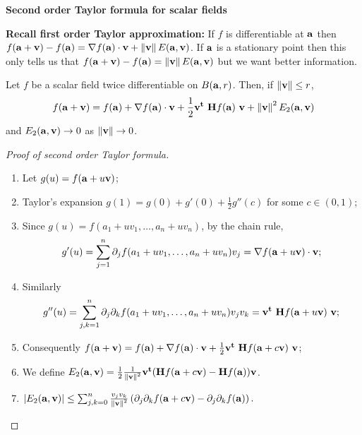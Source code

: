 \textbf{Second order Taylor formula for scalar fields}

\textbf{Recall first order Taylor approximation:}
If \(f\) is differentiable at \(\aa\)
then
\(  f(\aa+  \vv) - f(\aa)  = \nabla f(\aa) \cdot \vv + \norm{\vv}E(\aa,\vv)\).
If \(\aa\) is a stationary point then this only tells us that \(  f(\aa+  \vv) - f(\aa)  =  \norm{\vv}E(\aa,\vv)\) but we want better information.

\begin{theorem}
    Let \(f\) be a scalar field twice differentiable on \(B(\aa,r)\).
    Then, if \(\norm{\vv}\leq r\),
    \[
        f(\aa+\vv) = f(\aa) + \nabla f(\aa) \cdot \vv + \frac{1}{2} \vv^{\mathbf{t}} \ \mathbf{H} f (\aa) \ \vv + \norm{\vv}^2 E_2(\aa,\vv)
    \]
    and \(E_2(\aa,\vv) \to 0\) as \(\norm{\vv}\to 0\).
\end{theorem}





\textbf{}

\begin{proof}[Proof of second order Taylor formula]

    \begin{enumerate}
        \item Let \(g(u) = f(\aa + u \vv)\);
        \item Taylor's expansion \(g(1) = g(0) + g'(0) + \frac{1}{2} g''(c)\) for some \(c\in (0,1)\);
        \item Since \(g(u) = f(a_1 + uv_1, \ldots, a_n + u v_n)\), by the chain rule,
              \[
                  g'(u) = \sum_{j=1}^{n} \partial_j f( a_1 + uv_1, \ldots, a_n + u v_n ) v_j
                  =\nabla f( \aa + u \vv) \cdot \vv;
              \]
              \vspace{-2em}
        \item Similarly
              \vspace{-1em}
              \[
                  g''(u) = \sum_{j,k=1}^{n} \partial_j\partial_k f( a_1 + uv_1, \ldots, a_n + u v_n ) v_j v_k
                  =  \vv^{\mathbf{t}} \ \mathbf{H} f (\aa + u \vv) \ \vv;
              \]
              \vspace{-1em}
        \item Consequently
              \(
              f(\aa+\vv) = f(\aa) + \nabla f(\aa) \cdot \vv + \frac{1}{2} \vv^{\mathbf{t}} \ \mathbf{H} f (\aa + c\vv) \ \vv
              \);
        \item We define \(E_2(\aa,\vv) = \frac{1}{2} \frac{1}{\norm{\vv}^2} \vv^{\mathbf{t}} (\mathbf{H} f (\aa + c\vv) - \mathbf{H} f (\aa)  ) \vv\).
        \item \(\abs{E_2(\aa,\vv)} \leq \sum_{j,k=0}^{n}
              \frac{v_j v_k}{\norm{\vv}^2} \left( \partial_{j}\partial_{k}f(\aa+c\vv)-\partial_{j}\partial_{k}f(\aa) \right).\)
              \qedhere
    \end{enumerate}
\end{proof}


